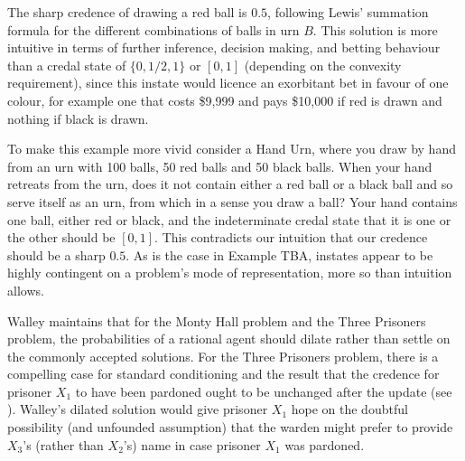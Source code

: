 \documentclass[11pt]{article}
\begin{document}

The sharp credence of drawing a red ball is $0.5$, following Lewis'
summation formula for the different combinations of balls in urn $B$.
This solution is more intuitive in terms of further inference,
decision making, and betting behaviour than a credal state of
$\{0,1/2,1\}$ or $[0,1]$ (depending on the convexity requirement),
since this instate would licence an exorbitant bet in favour of one
colour, for example one that costs \$9,999 and pays \$10,000 if red is
drawn and nothing if black is drawn.

To make this example more vivid consider a Hand Urn, where you draw by
hand from an urn with 100 balls, 50 red balls and 50 black balls. When
your hand retreats from the urn, does it not contain either a red ball
or a black ball and so serve itself as an urn, from which in a sense
you draw a ball? Your hand contains one ball, either red or black, and
the indeterminate credal state that it is one or the other should be
$[0,1]$. This contradicts our intuition that our credence should be a
sharp $0.5$. As is the case in Example TBA,
instates appear to be highly contingent on a problem's mode of
representation, more so than intuition allows.


Walley maintains that for the Monty Hall problem and the Three
Prisoners problem, the probabilities of a rational agent should dilate
rather than settle on the commonly accepted solutions. For the Three
Prisoners problem, there is a compelling case for standard
conditioning and the result that the credence for prisoner $X_{1}$ to
have been pardoned ought to be unchanged after the update (see
). Walley's dilated solution would give
prisoner $X_{1}$ hope on the doubtful possibility (and unfounded
assumption) that the warden might prefer to provide $X_{3}$'s (rather
than $X_{2}$'s) name in case prisoner $X_{1}$ was pardoned.
\end{document}
